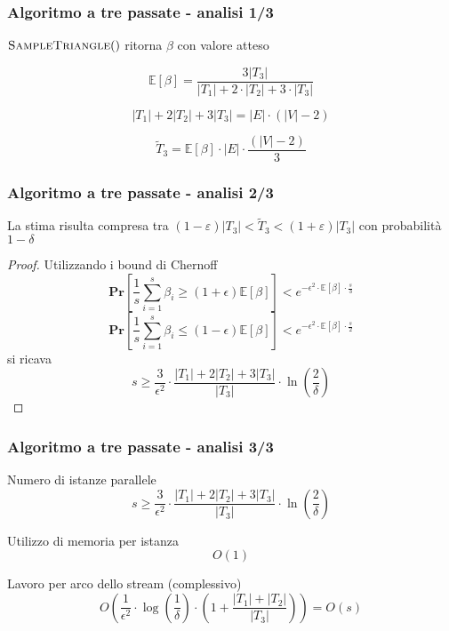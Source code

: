 \documentclass{beamer}
\begin{document}
\begin{frame}
\frametitle{Algoritmo a tre passate - analisi 1/3}

$\Call{SampleTriangle}{ }$ ritorna $\beta$ con valore atteso

\[
    \mathbb{E}[\beta]=\frac{3\left|T_{3}\right|}{\left|T_{1}\right|+2 \cdot\left|T_{2}\right|+3 \cdot\left|T_{3}\right|}
\]

\[
    \left|T_{1}\right|+2\left|T_{2}\right|+3\left|T_{3}\right|=|E| \cdot(|V|-2)
\]

\[
    \widetilde T_{3}
    =\mathbb{E}
    [\beta] \cdot|E| \cdot \frac{(|V|-2)}{3}
\]

\end{frame}

\begin{frame}
\frametitle{Algoritmo a tre passate - analisi 2/3}

\begin{lemma}
La stima risulta compresa tra
$
\left( 1 - \varepsilon \right)
| T_{3} |
<
\widetilde T_{3}
<
\left( 1 + \varepsilon \right)
| T_{3} |
$
con probabilità $1 - \delta$
\end{lemma}


\begin{proof}
    Utilizzando i bound di Chernoff
    \[
        \textbf{Pr}
        \left[ 
            \frac{1}{s}\sum_{i=1}^{s}\beta_i\geq(1+\epsilon)\mathbb{E}[\beta]
        \right]
        <e^{-\epsilon^2\cdot\mathbb{E}[\beta]\cdot\frac{s}{3}}
    \]
    \[
        \textbf{Pr}
        \left[ 
            \frac{1}{s}\sum_{i=1}^{s}\beta_i\leq(1-\epsilon)\mathbb{E}[\beta]
        \right]
        <e^{-\epsilon^2\cdot\mathbb{E}[\beta]\cdot\frac{s}{2}}
    \]
    si ricava
    \[
        s \geq \frac{3}{\epsilon^{2}} \cdot \frac{\left|T_{1}\right|+2\left|T_{2}\right|+3\left|T_{3}\right|}{\left|T_{3}\right|} \cdot \ln \left(\frac{2}{\delta}\right)
    \]
\end{proof}

\end{frame}


\begin{frame}
\frametitle{Algoritmo a tre passate - analisi 3/3}

Numero di istanze parallele
\[
    s \geq \frac{3}{\epsilon^{2}} \cdot \frac{\left|T_{1}\right|+2\left|T_{2}\right|+3\left|T_{3}\right|}{\left|T_{3}\right|} \cdot \ln \left(\frac{2}{\delta}\right)
\]

Utilizzo di memoria per istanza
\[
    O \left( 1 \right)
\]

Lavoro per arco dello stream (complessivo)
\[
    O\left(
    \frac{1}{\epsilon^{2}} \cdot \log \left(\frac{1}{\delta}\right) \cdot\left(1+\frac{\left|T_{1}\right|+\left|T_{2}\right|}{\left|T_{3}\right|}\right)\right)
    = O ( s )
\]

\end{frame}
\end{document}
